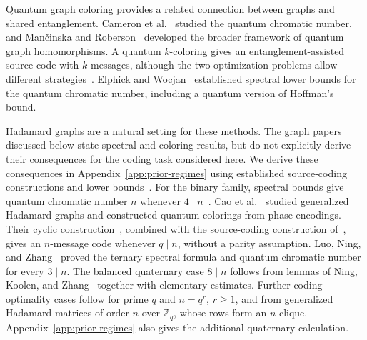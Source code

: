 \documentclass[11pt,a4paper]{article}
\numberwithin{equation}{section}
\numberwithin{figure}{section}
\numberwithin{table}{section}
\numberwithin{footnote}{section}
\theoremstyle{informal}\newtheorem*{informaltheorem}{Informal theorem}
\theoremstyle{definition}\newtheorem{example}{Example}[section]
\theoremstyle{remark}\newtheorem{remark}[theorem]{Remark}
\newcommand{\Z}{\mathbb Z}
\begin{document}
Quantum graph coloring provides a related connection between graphs
and shared entanglement. Cameron et al.~\cite{cmnsw} studied the
quantum chromatic number, and Man\v{c}inska and Roberson~\cite{mr}
developed the broader framework of quantum graph homomorphisms.
A quantum \(k\)-coloring gives an entanglement-assisted source code
with \(k\) messages, although the two optimization problems allow different
strategies~\cite[Sec.~1.3]{bblps}. Elphick and Wocjan~\cite{ew}
established spectral lower bounds for the quantum chromatic number,
including a quantum version of Hoffman's bound.

Hadamard graphs are a natural setting for these methods.
The graph papers discussed below state spectral and coloring results,
but do not explicitly derive their consequences for the coding task
considered here. We derive these consequences in
Appendix~\ref{app:prior-regimes} using established source-coding
constructions and lower bounds~\cite{bblps}.
For the binary family, spectral bounds give quantum chromatic
number \(n\) whenever \(4\mid n\)~\cite[Sec.~3.2]{wed}.
Cao et al.~\cite{cao} studied generalized Hadamard graphs and
constructed quantum colorings from phase encodings. Their cyclic
construction~\cite[Lemma~4.1]{cao}, combined with the source-coding
construction of~\cite[Lemma~5.1]{bblps}, gives an \(n\)-message
code whenever \(q\mid n\), without a parity assumption.
Luo, Ning, and Zhang~\cite{lnz} proved the ternary spectral formula
and quantum chromatic number for every \(3\mid n\).
The balanced quaternary case \(8\mid n\) follows from lemmas of
Ning, Koolen, and Zhang~\cite{nkz} together with elementary estimates.
Further coding optimality cases follow for prime \(q\) and
\(n=q^r\), \(r\geq1\), and from generalized Hadamard matrices
of order \(n\) over \(\Z_q\), whose rows form an \(n\)-clique.
Appendix~\ref{app:prior-regimes} also gives the additional quaternary
calculation.
\end{document}
